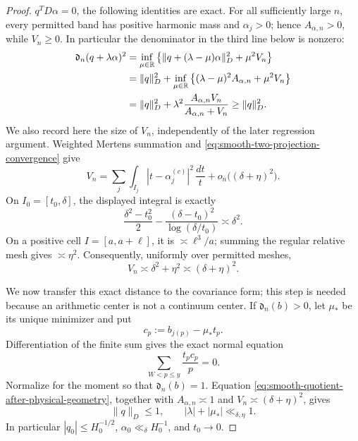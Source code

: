 \documentclass[11pt]{article}
\numberwithin{equation}{section}
\theoremstyle{definition}
\theoremstyle{remark}
\newcommand{\1}{\mathbf 1}
\begin{document}
\begin{proof}
\(q^TD\alpha=0\), the following identities are exact.  For all
sufficiently large \(n\), every permitted band has positive harmonic
mass and \(\alpha_j>0\); hence \(A_{\alpha,n}>0\), while \(V_n\geq0\).
In particular the denominator in the third line below is nonzero:
\begin{align}
 \mathfrak d_n(q+\lambda\alpha)^2
 &=\inf_{\mu\in\mathbb R}\left\{
      \|q+(\lambda-\mu)\alpha\|_D^2+\mu^2V_n\right\}\notag\\
 &=\|q\|_D^2+\inf_{\mu\in\mathbb R}\left\{
      (\lambda-\mu)^2A_{\alpha,n}+\mu^2V_n\right\}\notag\\
 &=\|q\|_D^2+\lambda^2
      \frac{A_{\alpha,n}V_n}{A_{\alpha,n}+V_n}
 \geq\|q\|_D^2.
 \label{eq:smooth-quotient-after-physical-geometry}
\end{align}
We also record here the size of \(V_n\), independently of the later
regression argument.  Weighted Mertens summation and
\eqref{eq:smooth-two-projection-convergence} give
\[
 V_n=\sum_j\int_{I_j}|t-\alpha_j^{(c)}|^2\,\frac{dt}{t}
          +o_n\bigl((\delta+\eta)^2\bigr).
\]
On \(I_0=[t_0,\delta]\), the displayed integral is exactly
\[
 \frac{\delta^2-t_0^2}{2}
 -\frac{(\delta-t_0)^2}{\log(\delta/t_0)}
 \asymp\delta^2.
\]
On a positive cell \(I=[a,a+\ell]\), it is
\(\asymp\ell^3/a\); summing the regular relative mesh gives
\(\asymp\eta^2\).  Consequently, uniformly over permitted meshes,
\begin{equation}
                         V_n\asymp\delta^2+\eta^2
                              \asymp(\delta+\eta)^2.
 \label{eq:smooth-arithmetic-cell-variance-size}
\end{equation}

We now transfer this exact distance to the covariance form; this step is
needed because an arithmetic center is not a continuum center.  If
\(\mathfrak d_n(b)>0\), let \(\mu_*\) be its unique minimizer and put
\begin{equation}
 c_p:=b_{j(p)}-\mu_*t_p.
 \label{eq:smooth-minimizing-prime-coefficients}
\end{equation}
Differentiation of the finite sum gives the exact normal equation
\begin{equation}
                 \sum_{W<p\leq y}\frac{t_pc_p}{p}=0.
 \label{eq:smooth-arithmetic-physical-normal-equation}
\end{equation}
Normalize for the moment so that \(\mathfrak d_n(b)=1\).
Equation \eqref{eq:smooth-quotient-after-physical-geometry}, together
with \(A_{\alpha,n}\asymp1\) and
\(V_n\asymp(\delta+\eta)^2\), gives
\[
 \|q\|_D\leq1,\qquad |\lambda|+|\mu_*|\ll_{\delta,\eta}1.
\]
In particular \(|q_0|\leq H_0^{-1/2}\),
\(\alpha_0\ll_{\delta}H_0^{-1}\), and \(t_0\to0\).


\end{proof}
\end{document}
